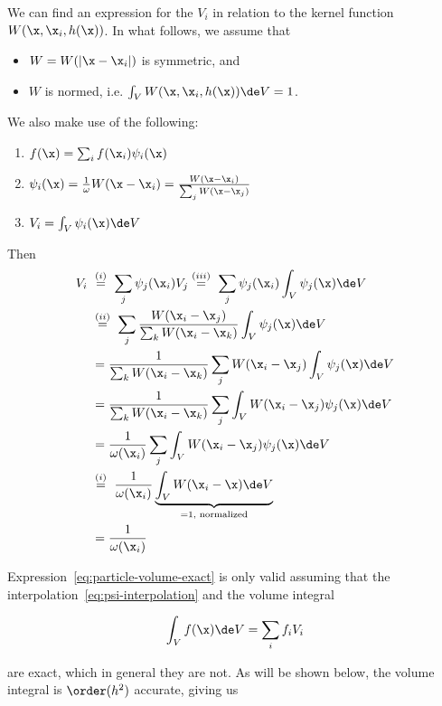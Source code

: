 We can find an expression for the $V_i$ in relation to the kernel function $W(\x, \x_i, h(\x))$. In
what follows, we assume that

\begin{itemize}
    \item $W = W(|\x - \x_i|)$ is symmetric, and
    \item $W$ is normed, i.e. $\int_V W(\x, \x_i, h(\x)) \de V = 1$.
\end{itemize}

We also make use of the following:
%
\begin{enumerate}[label=\roman*.]
\item $f(\x) = \sum_i f(\x_i) \psi_i(\x)$
\item $\psi_i(\x) = \frac{1}{\omega} W(\x - \x_i) = \frac{W(\x - \x_i)}{\sum_j W(\x - \x_j)}$
\item $V_i = \int_V \psi_i(\x) \de V$
\end{enumerate}
%
Then
%
\begin{align}
V_i \
    &\overset{(i)}{=} \ \sum_j \psi_j(\x_i) V_j
    \overset{(iii)}{=} \ \sum_j \psi_j (\x_i) \int_V \psi_j(\x) \de V \\
    &\overset{(ii)}{=} \ \sum_j \frac{W(\x_i - \x_j)}{\sum_k W(\x_i - \x_k)} \int_V \psi_j(\x) \de
V \\
    &= \frac{1}{\sum_k W(\x_i - \x_k)}  \sum_j W(\x_i - \x_j) \int_V \psi_j(\x) \de V \\
    &= \frac{1}{\sum_k W(\x_i - \x_k)}  \sum_j \int_V W(\x_i - \x_j) \psi_j(\x) \de V \\
    &= \frac{1}{\omega(\x_i)}  \sum_j \int_V W(\x_i - \x_j) \psi_j(\x) \de V \\
    &\overset{(i)}{=} \
        \frac{1}{\omega(\x_i)}\underbrace{\int_V W(\x_i - \x) \de V}_{=1 \text{, normalized}} \\
    &= \frac{1}{\omega(\x_i)} \label{eq:particle-volume-exact}
\end{align}

Expression~\ref{eq:particle-volume-exact} is only valid assuming that the
interpolation~\ref{eq:psi-interpolation} and the volume integral

\begin{align}
    \int_V f(\x) \de V = \sum_i f_i V_i \label{eq:psi-volume-integral-step}
\end{align}

are exact, which in general they are not. As will be shown below, the volume integral is
$\order(h^2)$ accurate, giving us

